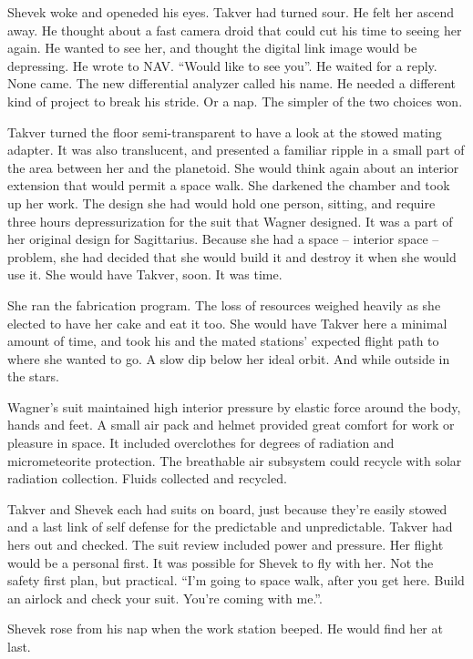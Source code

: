Shevek woke and openeded his eyes.  Takver had turned sour.  He felt
her ascend away.  He thought about a fast camera droid that could cut
his time to seeing her again.  He wanted to see her, and thought the
digital link image would be depressing.  He wrote to NAV.  ``Would
like to see you''.  He waited for a reply.  None came.  The new
differential analyzer called his name.  He needed a different kind of
project to break his stride.  Or a nap.  The simpler of the two
choices won.

Takver turned the floor semi-transparent to have a look at the stowed
mating adapter.  It was also translucent, and presented a familiar
ripple in a small part of the area between her and the planetoid.  She
would think again about an interior extension that would permit a
space walk.  She darkened the chamber and took up her work.  The
design she had would hold one person, sitting, and require three hours
depressurization for the suit that Wagner designed.  It was a part of
her original design for Sagittarius.  Because she had a space --
interior space -- problem, she had decided that she would build it and
destroy it when she would use it.  She would have Takver, soon.  It
was time.

She ran the fabrication program.  The loss of resources weighed
heavily as she elected to have her cake and eat it too.  She would
have Takver here a minimal amount of time, and took his and the mated
stations' expected flight path to where she wanted to go.  A slow dip
below her ideal orbit.  And while outside in the stars.

Wagner's suit maintained high interior pressure by elastic force
around the body, hands and feet.  A small air pack and helmet provided
great comfort for work or pleasure in space.  It included overclothes
for degrees of radiation and micrometeorite protection.  The
breathable air subsystem could recycle with solar radiation
collection.  Fluids collected and recycled.

Takver and Shevek each had suits on board, just because they're easily
stowed and a last link of self defense for the predictable and
unpredictable.  Takver had hers out and checked.  The suit review
included power and pressure.  Her flight would be a personal first.
It was possible for Shevek to fly with her.  Not the safety first
plan, but practical.  ``I'm going to space walk, after you get here.
Build an airlock and check your suit.  You're coming with me.''.

Shevek rose from his nap when the work station beeped.  He would find
her at last.

